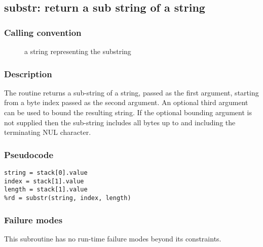 \clearpage
{}
{}
\label{subr:substr}
\subsection*{substr: return a sub string of a string}

\subsubsection*{Calling convention}

\begin{description}
\item[] a string representing the substring
\end{description}

\subsubsection*{Description}

The  routine returns a sub-string of a string,
passed as the first argument, starting from a byte index passed as the
second argument.  An optional third argument can be used to bound the
resulting string.  If the optional bounding argument is not supplied
then the sub-string includes all bytes up to and including the
terminating NUL character.

\subsubsection*{Pseudocode}

\begin{verbatim}
string = stack[0].value
index = stack[1].value
length = stack[1].value
%rd = substr(string, index, length)
\end{verbatim}

\subsubsection*{Failure modes}

This subroutine has no run-time failure modes beyond its constraints.
